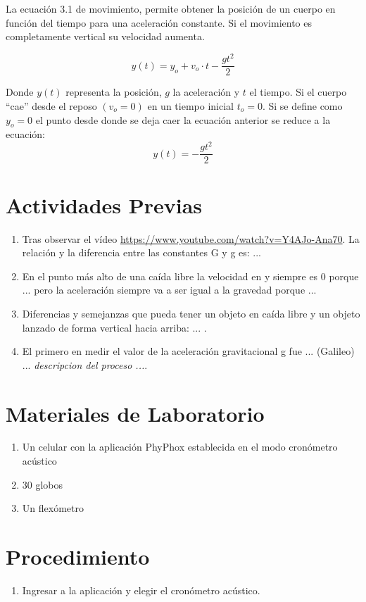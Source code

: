 \begin{multicols}{2}
La ecuación 3.1 de movimiento, permite obtener la posición de un cuerpo en función del tiempo para una aceleración constante. Si el movimiento es completamente vertical su velocidad aumenta.


\[y(t) = y_o + v_o \cdot t  - \dfrac{g t^2}{2} \]

Donde $y(t)$ representa la posición, $g$ la aceleración y $t$ el tiempo. Si el cuerpo “cae” desde el reposo $(v_o = 0)$ en un tiempo inicial $t_o = 0$. Si se define como $y_o = 0$ el punto desde donde se deja caer la ecuación anterior se reduce a la ecuación:
\[ y(t) = - \dfrac{g t^2}{2} \]

\section*{Actividades Previas}   
\begin{enumerate}
\item Tras observar el vídeo \url{https://www.youtube.com/watch?v=Y4AJo-Ana70}. La relación y la diferencia entre las constantes G y g es: ...
\item  En el punto más alto de una caída libre la velocidad en y siempre es 0 porque ... pero la aceleración siempre va a ser igual a la gravedad porque ...
\item Diferencias y semejanzas que pueda tener un objeto en caída libre y un objeto lanzado de forma vertical hacia arriba: ... .
\item El primero en medir el valor de la aceleración gravitacional g fue ... (Galileo) ... \textit{descripcion del proceso ...}.

\end{enumerate}
    
\section*{Materiales de Laboratorio}  
\begin{enumerate}
    \item Un celular con la aplicación PhyPhox establecida en el modo cronómetro acústico
    \item 30 globos
    \item Un flexómetro
\end{enumerate}

\section*{Procedimiento}
\begin{enumerate}
    \item Ingresar a la aplicación y elegir el cronómetro acústico.


\end{enumerate}
\end{multicols}
